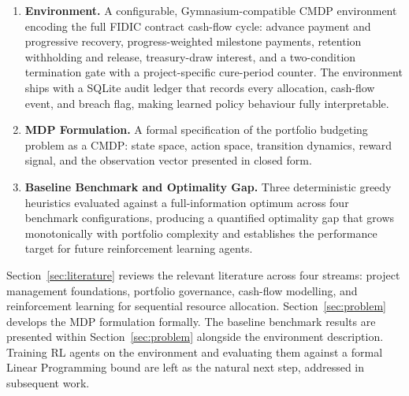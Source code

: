 \begin{enumerate}[leftmargin=*, label=\textbf{C\arabic*.}]

    \item \textbf{Environment.} A configurable, Gymnasium-compatible CMDP
    environment encoding the full FIDIC contract cash-flow cycle: advance
    payment and progressive recovery, progress-weighted milestone payments,
    retention withholding and release, treasury-draw interest, and a
    two-condition termination gate with a project-specific cure-period counter.
    The environment ships with a SQLite audit ledger that records every
    allocation, cash-flow event, and breach flag, making learned policy
    behaviour fully interpretable.

    \item \textbf{MDP Formulation.} A formal specification of the
    portfolio budgeting problem as a CMDP: state space, action space, transition
    dynamics, reward signal, and the observation vector presented in closed form.

    \item \textbf{Baseline Benchmark and Optimality Gap.} Three deterministic
    greedy heuristics evaluated against a full-information optimum across four
    benchmark configurations, producing a quantified optimality gap that grows
    monotonically with portfolio complexity and establishes the performance
    target for future reinforcement learning agents.

\end{enumerate}

Section~\ref{sec:literature} reviews the relevant literature across four
streams: project management foundations, portfolio governance, cash-flow
modelling, and reinforcement learning for sequential resource allocation.
Section~\ref{sec:problem} develops the MDP formulation formally.
The baseline benchmark results are presented within Section~\ref{sec:problem}
alongside the environment description.
Training RL agents on the environment and evaluating them against a formal
Linear Programming bound are left as the natural next step, addressed in
subsequent work.